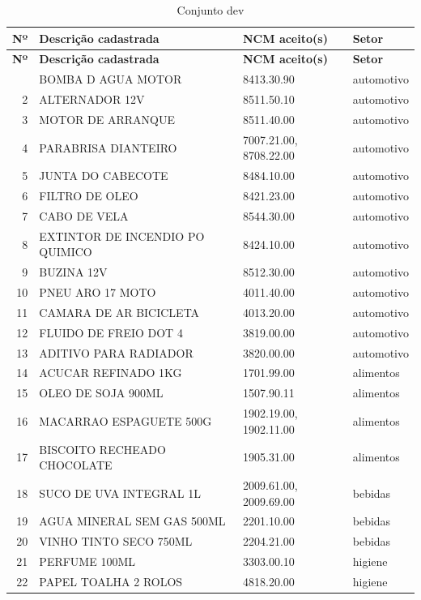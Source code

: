 \begin{apendicesenv}
\begin{center}
\small
\begin{longtable}{r p{6.6cm} p{4.4cm} p{2.6cm}}
\caption{Conjunto dev}\label{tab:ap_dev} \\
\hline
\textbf{Nº} & \textbf{Descrição cadastrada} & \textbf{NCM aceito(s)} & \textbf{Setor} \\
\hline
\endfirsthead
\hline
\textbf{Nº} & \textbf{Descrição cadastrada} & \textbf{NCM aceito(s)} & \textbf{Setor} \\
\hline
\endhead
\hline
\endfoot
1 & BOMBA D AGUA MOTOR & 8413.30.90 & automotivo \\
2 & ALTERNADOR 12V & 8511.50.10 & automotivo \\
3 & MOTOR DE ARRANQUE & 8511.40.00 & automotivo \\
4 & PARABRISA DIANTEIRO & 7007.21.00, 8708.22.00 & automotivo \\
5 & JUNTA DO CABECOTE & 8484.10.00 & automotivo \\
6 & FILTRO DE OLEO & 8421.23.00 & automotivo \\
7 & CABO DE VELA & 8544.30.00 & automotivo \\
8 & EXTINTOR DE INCENDIO PO QUIMICO & 8424.10.00 & automotivo \\
9 & BUZINA 12V & 8512.30.00 & automotivo \\
10 & PNEU ARO 17 MOTO & 4011.40.00 & automotivo \\
11 & CAMARA DE AR BICICLETA & 4013.20.00 & automotivo \\
12 & FLUIDO DE FREIO DOT 4 & 3819.00.00 & automotivo \\
13 & ADITIVO PARA RADIADOR & 3820.00.00 & automotivo \\
14 & ACUCAR REFINADO 1KG & 1701.99.00 & alimentos \\
15 & OLEO DE SOJA 900ML & 1507.90.11 & alimentos \\
16 & MACARRAO ESPAGUETE 500G & 1902.19.00, 1902.11.00 & alimentos \\
17 & BISCOITO RECHEADO CHOCOLATE & 1905.31.00 & alimentos \\
18 & SUCO DE UVA INTEGRAL 1L & 2009.61.00, 2009.69.00 & bebidas \\
19 & AGUA MINERAL SEM GAS 500ML & 2201.10.00 & bebidas \\
20 & VINHO TINTO SECO 750ML & 2204.21.00 & bebidas \\
21 & PERFUME 100ML & 3303.00.10 & higiene \\
22 & PAPEL TOALHA 2 ROLOS & 4818.20.00 & higiene \\

\end{longtable}
\end{center}
\end{apendicesenv}
